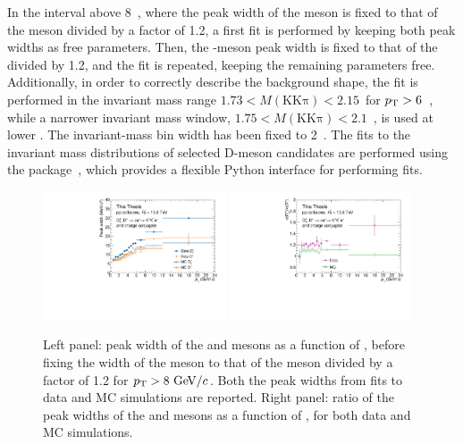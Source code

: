 In the \pt interval above 8~\gevc, where the peak width of the \dpl meson is fixed to that of the \ds meson divided by a factor of 1.2, a first fit is performed by keeping both peak widths as free parameters. Then, the \dpl-meson peak width is fixed to that of the \ds divided by 1.2, and the fit is repeated, keeping the remaining parameters free. Additionally, in order to correctly describe the background shape, the fit is performed in the invariant mass range $1.73<M(\mathrm{KK\pi})<2.15$~\gevcc for $p_\mathrm{T}>6$~\gevc, while a narrower invariant mass window, $1.75<M(\mathrm{KK\pi})<2.1$~\gevcc, is used at lower \pt. The invariant-mass bin width has been fixed to 2~\mevcc. The fits to the invariant mass distributions of selected D-meson candidates are performed using the  package~\cite{grosa_2023_7579657}, which provides a flexible Python interface for performing fits. 

\begin{figure}[htb]
    \centering
    \includegraphics[width=0.48\textwidth]{Figures/Chapter 5/SigmaDs_Dplus.pdf}
    \includegraphics[width=0.48\textwidth]{Figures/Chapter 5/SigmaDsOverDplusMC.pdf}
    \caption{Left panel: peak width of the \ds and \dpl mesons as a function of \pt, before fixing the width of the \dpl meson to that of the \ds meson divided by a factor of 1.2 for $p_\mathrm{T}>8~\mathrm{Ge\kern-.1emV}/c$. Both the peak widths from fits to data and MC simulations are reported. Right panel: ratio of the peak widths of the \ds and \dpl mesons as a function of \pt, for both data and MC simulations.}
    \label{fig:sigma_ratio}
\end{figure}


